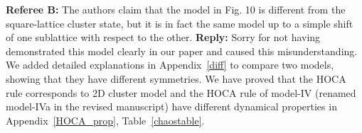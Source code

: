 \documentclass{article}
\begin{document}
\begin{tcolorbox}[title=Reply 10 (point-to-point reply)]
\textbf{Referee B:}  The authors claim that the model in Fig. 10 is different from the
square-lattice cluster state, but it is in fact the same model up to a
simple shift of one sublattice with respect to the other.
\tcblower
\textbf{Reply:} Sorry for not having demonstrated this model clearly in our paper and caused this misunderstanding. We added detailed explanations in Appendix~\ref{diff} to compare two models, showing that they have different symmetries. We have proved that the HOCA rule corresponds to 2D cluster model and the HOCA rule of model-IV (renamed model-IVa in the revised manuscript) have different dynamical properties in Appendix~\ref{HOCA_prop}, Table~\ref{chaostable}.
\end{tcolorbox}
\end{document}
